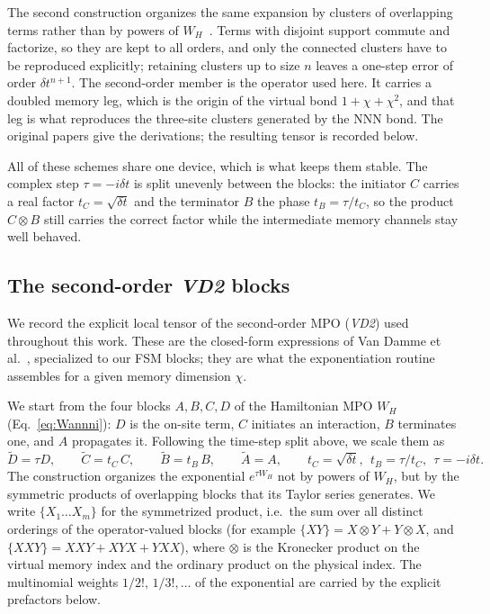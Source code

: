 The second construction organizes the same expansion by clusters of overlapping terms rather than by powers of $W_H$~\cite{vandamme2024}. Terms with disjoint support commute and factorize, so they are kept to all orders, and only the connected clusters have to be reproduced explicitly; retaining clusters up to size $n$ leaves a one-step error of order $\delta t^{n+1}$. The second-order member is the operator used here. It carries a doubled memory leg, which is the origin of the virtual bond $1+\chi+\chi^2$, and that leg is what reproduces the three-site clusters generated by the \ac{NNN} bond. The original papers give the derivations; the resulting tensor is recorded below.

All of these schemes share one device, which is what keeps them stable. The complex step $\tau=-i\delta t$ is split unevenly between the blocks: the initiator $C$ carries a real factor $t_C=\sqrt{\delta t}$ and the terminator $B$ the phase $t_B=\tau/t_C$, so the product $C\otimes B$ still carries the correct factor while the intermediate memory channels stay well behaved.

\subsection{The second-order \textit{VD2} blocks}
\label{app:mpo:vd2}

We record the explicit local tensor of the second-order MPO (\textit{VD2}) used throughout this work. These are the closed-form expressions of Van Damme et al.~\cite{vandamme2024}, specialized to our \ac{FSM} blocks; they are what the exponentiation routine assembles for a given memory dimension $\chi$.

We start from the four blocks $A,B,C,D$ of the Hamiltonian MPO $W_H$ (Eq.~\eqref{eq:Wannni}): $D$ is the on-site term, $C$ initiates an interaction, $B$ terminates one, and $A$ propagates it. Following the time-step split above, we scale them as
\begin{equation}
  \tilde D = \tau D, \qquad \tilde C = t_C\, C, \qquad \tilde B = t_B\, B, \qquad \tilde A = A,
  \qquad t_C = \sqrt{\delta t},\ \ t_B = \tau/t_C,\ \ \tau=-i\delta t .
\end{equation}
The construction organizes the exponential $e^{\tau W_H}$ not by powers of $W_H$, but by the symmetric products of overlapping blocks that its Taylor series generates. We write $\{X_1\dots X_m\}$ for the symmetrized product, i.e.\ the sum over all distinct orderings of the operator-valued blocks (for example $\{XY\}=X\otimes Y + Y\otimes X$, and $\{XXY\}=XXY+XYX+YXX$), where $\otimes$ is the Kronecker product on the virtual memory index and the ordinary product on the physical index. The multinomial weights $1/2!,\,1/3!,\dots$ of the exponential are carried by the explicit prefactors below.

